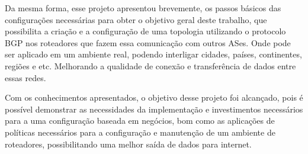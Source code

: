 \documentclass[12pt,a4paper]{report}
\begin{document}
Da mesma forma, esse projeto apresentou brevemente, os passos b\'asicos das configura\c{c}\~oes necess\'arias para obter o objetivo geral deste trabalho, que possibilita a cria\c{c}\~ao e a configura\c{c}\~ao de uma topologia utilizando o protocolo BGP nos roteadores que fazem essa comunica\c{c}\~ao com outros ASes. Onde pode ser aplicado em um ambiente real, podendo interligar cidades, pa\'ises, continentes, regi\~oes e etc. Melhorando a qualidade de conex\~ao e transfer\^encia de dados entre essas redes.

Com os conhecimentos apresentados, o objetivo desse projeto foi alcan\c{c}ado, pois \'e possível demonstrar as necessidades da implementa\c{c}\~ao e investimentos necess\'arios para a uma configura\c{c}\~ao baseada em neg\'ocios, bom como as aplica\c{c}\~oes de pol\'iticas necess\'arios para a configura\c{c}\~ao e manuten\c{c}\~ao de um ambiente de roteadores, possibilitando uma melhor sa\'ida de dados para internet.




\nocite{*}
\end{document}
